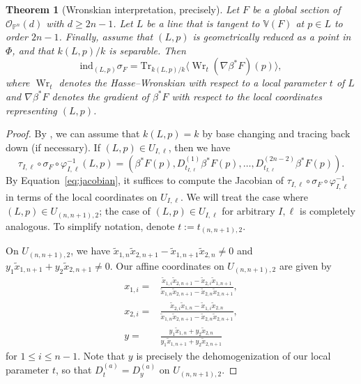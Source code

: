 \documentclass[12pt]{amsart}
\numberwithin{equation}{section}
\theoremstyle{plain}
\newtheorem{thm}{Theorem}[section]
\theoremstyle{definition}
\newcommand{\mb}[1]{\mathbb{#1}}
\newcommand{\mc}[1]{\mathcal{#1}}
\newcommand{\vphi}{\varphi}
\newcommand{\Tr}{\mathrm{Tr}}
\newcommand{\ind}{\mathrm{ind}}
\newcommand{\Wr}{\operatorname{Wr}}
\begin{document}
\begin{thm}[Wronskian interpretation, precisely]
Let $F$ be a global section of $\mc{O}_{\mb{P}^n}(d)$ with $d\geq 2n-1$. Let $L$ be a line that is tangent to $\mb{V}(F)$ at $p\in L$ to order $2n-1$. Finally, assume that $(L,p)$ is geometrically reduced as a point in $\Phi$, and that $k(L,p)/k$ is separable. Then
\[\ind_{(L,p)}\sigma_F=\Tr_{k(L,p)/k}\langle\Wr_t(\nabla\beta^* F)(p)\rangle,\]
where $\Wr_t$ denotes the Hasse--Wronskian with respect to a local parameter $t$ of $L$ and $\nabla\beta^* F$ denotes the gradient of $\beta^* F$ with respect to the local coordinates representing $(L,p)$.
\end{thm}
\begin{proof}
    By \cite{BBMMO21}, we can assume that $k(L,p)=k$ by base changing and tracing back down (if necessary). If $(L,p)\in U_{I,\ell}$, then we have
    \[\tau_{I,\ell}\circ\sigma_F\circ\vphi^{-1}_{I,\ell}(L,p)=(\beta^*F(p),D^{(1)}_{t_{I,\ell}}\beta^*F(p),\ldots,D^{(2n-2)}_{t_{I,\ell}}\beta^*F(p)).\]
    By Equation~\ref{eq:jacobian}, it suffices to compute the Jacobian of $\tau_{I,\ell}\circ\sigma_F\circ\vphi^{-1}_{I,\ell}$ in terms of the local coordinates on $U_{I,\ell}$. We will treat the case where $(L,p)\in U_{(n,n+1),2}$; the case of $(L,p)\in U_{I,\ell}$ for arbitrary $I,\ell$ is completely analogous. To simplify notation, denote $t:=t_{(n,n+1),2}$.

    On $U_{(n,n+1),2}$, we have $\tilde{x}_{1,n}\tilde{x}_{2,n+1}-\tilde{x}_{1,n+1}\tilde{x}_{2,n}\neq 0$ and $y_1\tilde{x}_{1,n+1}+y_2\tilde{x}_{2,n+1}\neq 0$. Our affine coordinates on $U_{(n,n+1),2}$ are given by
    \begin{align*}
        x_{1,i}={}&\frac{\tilde{x}_{1,i}\tilde{x}_{2,n+1}-\tilde{x}_{2,i}\tilde{x}_{1,n+1}}{\tilde{x}_{1,n}\tilde{x}_{2,n+1}-\tilde{x}_{2,n}\tilde{x}_{2,n+1}},\\
        x_{2,i}={}&\frac{\tilde{x}_{2,i}\tilde{x}_{1,n}-\tilde{x}_{1,i}\tilde{x}_{2,n}}{\tilde{x}_{1,n}\tilde{x}_{2,n+1}-\tilde{x}_{2,n}\tilde{x}_{2,n+1}},\\
        y={}&\frac{y_1\tilde{x}_{1,n}+y_2\tilde{x}_{2,n}}{y_1\tilde{x}_{1,n+1}+y_2\tilde{x}_{2,n+1}}
    \end{align*}
    for $1\leq i\leq n-1$. Note that $y$ is precisely the dehomogenization of our local parameter $t$, so that $D^{(a)}_t=D^{(a)}_y$ on $U_{(n,n+1),2}$.
    

\end{proof}
\end{document}
